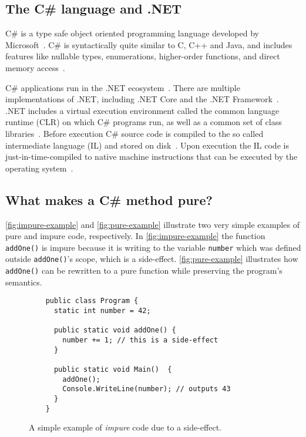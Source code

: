 \documentclass[a4paper,12pt]{article}
\begin{document}
\subsection{The C\# language and .NET} \label{sub:the-csharp-language}
C\# is a type safe object oriented programming language developed by Microsoft~\cite{intro-to-Csharp}. C\# is syntactically quite similar to C, C++ and Java, and includes features like nullable types, enumerations, higher-order functions, and direct memory access~\cite{intro-to-Csharp}.

C\# applications run in the .NET ecosystem~\cite{intro-to-Csharp}. There are multiple implementations of .NET, including .NET Core and the .NET Framework~\cite{intro-to-Csharp}. .NET includes a virtual execution environment called the common language runtime (CLR) on which C\# programs run, as well as a common set of class libraries~\cite{intro-to-Csharp}. Before execution C\# source code is compiled to the so called intermediate language (IL) and stored on disk~\cite{intro-to-Csharp}. Upon execution the IL code is just-in-time-compiled to native machine instructions that can be executed by the operating system~\cite{intro-to-Csharp}.

\subsection{What makes a C\# method pure?} \label{sub:What makes a Cs program functional?}
\autoref{fig:impure-example} and \autoref{fig:pure-example} illustrate two very simple examples of pure and impure code, respectively. In \autoref{fig:impure-example} the function \texttt{addOne()} is impure because it is writing to the variable \texttt{number} which was defined outside \texttt{addOne()}'s scope, which is a side-effect. \autoref{fig:pure-example} illustrates how \texttt{addOne()} can be rewritten to a pure function while preserving the program's semantics.

\begin{figure}[H]
  \centering
  \begin{lstlisting}
    public class Program {
      static int number = 42;

      public static void addOne() {
        number += 1; // this is a side-effect
      }

      public static void Main()  {
        addOne();
        Console.WriteLine(number); // outputs 43
      }
    }
  \end{lstlisting}
  \caption{A simple example of \textit{impure} code due to a side-effect.}
  \label{fig:impure-example}
\end{figure}
\end{document}
